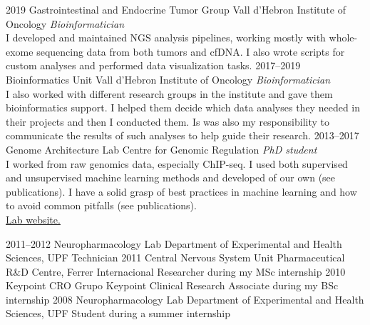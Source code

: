 \documentclass[]{friggeri-cv} %
\begin{document}
\begin{entrylist}

  \entry
    {2019}
    {Gastrointestinal and Endocrine Tumor Group}
    {Vall d'Hebron Institute of Oncology}
    {\emph{Bioinformatician}\\
    I developed and maintained NGS analysis pipelines,
    working mostly with whole-exome sequencing data from both
    tumors and cfDNA. I also wrote scripts for custom
    analyses and performed data visualization tasks.
    }
  \entry
    {2017--2019}
    {Bioinformatics Unit}
    {Vall d'Hebron Institute of Oncology}
    {\emph{Bioinformatician}\\
    I also worked with different research groups in the institute
    and gave them bioinformatics support. I helped them decide
    which data analyses they needed in their projects and then
    I conducted them. Is was also my responsibility to
    communicate the results of such analyses to help guide
    their research.
    }
  \entry
    {2013--2017}
    {Genome Architecture Lab}
    {Centre for Genomic Regulation}
    {\emph{PhD student}\\
    I worked from raw genomics data, especially ChIP-seq.
    I used both supervised
    and unsupervised machine learning methods and developed of our
    own (see publications). I have a solid grasp of best practices in
    machine learning and how to avoid common pitfalls (see
    publications).\\
    \href{http://www.genomearchitecture.com}{{\FA \faExternalLink} Lab website.}}
\end{entrylist}
\begin{entrylist}
  \entry
    {2011--2012}
    {Neuropharmacology Lab}
    {Department of Experimental and Health Sciences, UPF}
    {Technician}
  \entry
    {2011}
    {Central Nervous System Unit}
    {Pharmaceutical R\&D Centre, Ferrer Internacional}
    {Researcher during my MSc internship}
  \entry
    {2010}
    {Keypoint CRO}
    {Grupo Keypoint}
    {Clinical Research Associate during my BSc internship}
  \entry
    {2008}
    {Neuropharmacology Lab}
    {Department of Experimental and Health Sciences, UPF}
    {Student during a summer internship}

\end{entrylist}

\end{document}
